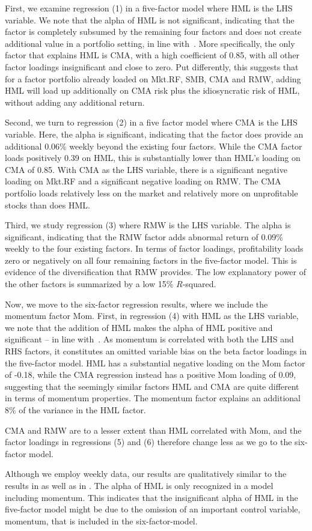 First, we examine regression (1) in a five-factor model where HML is the LHS variable. We note that the alpha of HML is not significant, indicating that the factor is completely subsumed by the remaining four factors and does not create additional value in a portfolio setting, in line with~\textcite{FF2015}. More specifically, the only factor that explains HML is CMA, with a high coefficient of 0.85, with all other factor loadings insignificant and close to zero. Put differently, this suggests that for a factor portfolio already loaded on Mkt.RF, SMB, CMA and RMW, adding HML will load up additionally on CMA risk plus the idiosyncratic risk of HML, without adding any additional return.

Second, we turn to regression (2) in a five factor model where CMA is the LHS variable. Here, the alpha is significant, indicating that the factor does provide an additional 0.06\% weekly beyond the existing four factors. While the CMA factor loads positively 0.39 on HML, this is substantially lower than HML's loading on CMA of 0.85. With CMA as the LHS variable, there is a significant negative loading on Mkt.RF and a significant negative loading on RMW. The CMA portfolio loads relatively less on the market and relatively more on unprofitable stocks than does HML.

Third, we study regression (3) where RMW is the LHS variable. The alpha is significant, indicating that the RMW factor adds abnormal return of 0.09\% weekly to the four existing factors. In terms of factor loadings, profitability loads zero or negatively on all four remaining factors in the five-factor model. This is evidence of the diversification that RMW provides. The low explanatory power of the other factors is summarized by a low 15\% $R$-squared.



Now, we move to the six-factor regression results, where we include the momentum factor Mom. First, in regression (4) with HML as the LHS variable, we note that the addition of HML makes the alpha of HML positive and significant -- in line with~\textcite{Asness2015}. As momentum is correlated with both the LHS and RHS factors, it constitutes an omitted variable bias on the beta factor loadings in the five-factor model. HML has a substantial negative loading on the Mom factor of -0.18, while the CMA regression instead has a positive Mom loading of 0.09, suggesting that the seemingly similar factors HML and CMA are quite different in terms of momentum properties. The momentum factor explains an additional 8\% of the variance in the HML factor. 

CMA and RMW are to a lesser extent than HML correlated with Mom, and the factor loadings in regressions (5) and (6) therefore change less as we go to the six-factor model.

Although we employ weekly data, our results are qualitatively similar to the results in \textcite{FF2015} as well as in \textcite{Asness2015}. The alpha of HML is only recognized in a model including momentum. This indicates that the insignificant alpha of HML in the five-factor model might be due to the omission of an important control variable, momentum, that is included in the six-factor-model.


